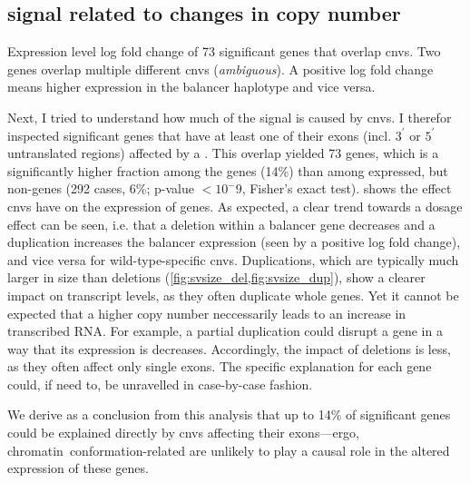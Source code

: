 \subsection{\texorpdfstring{\ase}{ASE} signal related to changes in copy number}
\label{sec:balancer_ase_cnvs}

%
%
    {Expression level log fold change of 73 significant \ase genes that overlap
    \acp{cnv}. Two genes overlap multiple different \acp{cnv} (\textit{ambiguous}).
    A positive log fold change means higher expression in the balancer haplotype
    and vice versa.}

Next, I tried to understand how much of the \ase signal is caused by \acp{cnv}.
I therefor inspected significant \ase genes that have at least one of their
exons (incl. $3^\prime$ or $5^\prime$ untranslated regions) affected by a \cnv.
This overlap yielded 73 genes, which is a significantly higher fraction
among the \ase genes (14\%) than among expressed, but non-\ase genes (292 cases,
6\%; p-value $<10^-9$, Fisher's exact test).  shows
the effect \acp{cnv} have on the expression of \ase genes. As expected, a
clear trend towards a dosage effect can be seen, i.e. that a deletion within a
balancer gene decreases and a duplication increases the balancer
expression (seen by a positive log fold change), and vice versa for
wild-type-specific \acp{cnv}. Duplications, which are typically much larger in
size than deletions (\cref{fig:svsize_del,fig:svsize_dup}), show a
clearer impact on transcript levels, as they often duplicate whole genes.
Yet it cannot be expected that a higher copy number neccessarily leads to an
increase in transcribed RNA. For example, a partial duplication could disrupt a
gene in a way that its expression is decreases. Accordingly, the impact of
deletions is less, as they often affect only single exons.
The specific explanation for each gene could, if need to, be unravelled
in case-by-case fashion.

We derive as a conclusion from this analysis that up to 14\% of significant \ase
genes could be explained directly by \acp{cnv} affecting their exons---ergo,
chromatin\ conformation-related are unlikely to play a causal role in the altered
expression of these genes.





